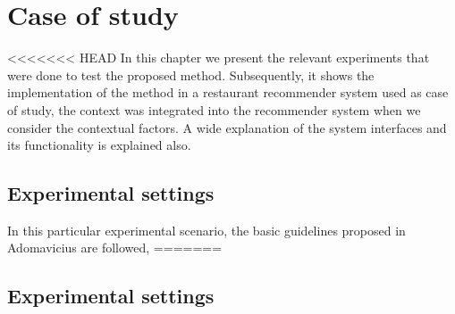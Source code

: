 \chapter{Case of study} \label{case}

<<<<<<< HEAD
In this chapter we present the relevant experiments that were done to
test the proposed method. Subsequently, it shows the implementation of
the method in a restaurant recommender system used as case of study, 
the context was integrated into the recommender system when   
we consider the contextual factors. A wide explanation of the system  
interfaces and its functionality is explained also.

\section{Experimental settings} 

In this particular experimental scenario, the basic guidelines 
proposed in Adomavicius  \cite{adomavicius2011context} are followed,  
=======
\section{Experimental settings} 

